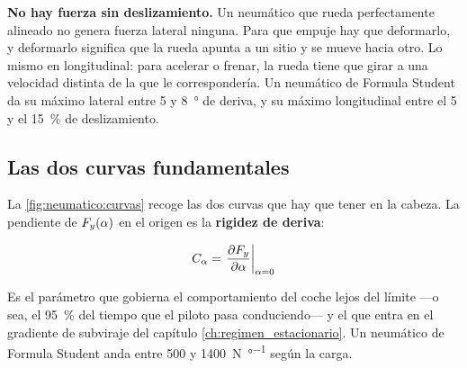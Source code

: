 \begin{clave}
\textbf{No hay fuerza sin deslizamiento.} Un neumático que rueda perfectamente
alineado no genera fuerza lateral ninguna. Para que empuje hay que deformarlo, y
deformarlo significa que la rueda apunta a un sitio y se mueve hacia otro. Lo
mismo en longitudinal: para acelerar o frenar, la rueda tiene que girar a una
velocidad distinta de la que le correspondería. Un neumático de Formula Student
da su máximo lateral entre \num{5} y \SI{8}{\degree} de deriva, y su máximo
longitudinal entre el \num{5} y el \SI{15}{\percent} de deslizamiento.
\end{clave}

\subsection{Las dos curvas fundamentales}

La \cref{fig:neumatico:curvas} recoge las dos curvas que hay que tener en la
cabeza. La pendiente de $F_y(\alpha)$ en el origen es la \textbf{rigidez de
deriva}:

\begin{equation}
  C_{\alpha} = \left.\frac{\partial F_y}{\partial \alpha}\right|_{\alpha=0}
  \label{eq:cornering_stiffness}
\end{equation}

Es el parámetro que gobierna el comportamiento del coche lejos del límite ---o
sea, el \SI{95}{\percent} del tiempo que el piloto pasa conduciendo--- y el que
entra en el gradiente de subviraje del capítulo \ref{ch:regimen_estacionario}.
Un neumático de Formula Student anda entre \num{500} y
\SI{1400}{\newton\per\degree} según la carga.

